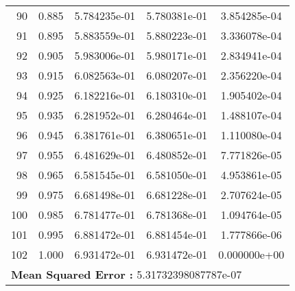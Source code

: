 \begin{table}[ht]
\begin{tabular}{rcccc}
    90 &  0.885 &    5.784235e-01 &    5.780381e-01  &     3.854285e-04\\ 
    91 &  0.895 &    5.883559e-01 &    5.880223e-01  &     3.336078e-04\\ 
    92 &  0.905 &    5.983006e-01 &    5.980171e-01  &     2.834941e-04\\ 
    93 &  0.915 &    6.082563e-01 &    6.080207e-01  &     2.356220e-04\\ 
    94 &  0.925 &    6.182216e-01 &    6.180310e-01  &     1.905402e-04\\ 
    95 &  0.935 &    6.281952e-01 &    6.280464e-01  &     1.488107e-04\\ 
    96 &  0.945 &    6.381761e-01 &    6.380651e-01  &     1.110080e-04\\ 
    97 &  0.955 &    6.481629e-01 &    6.480852e-01  &     7.771826e-05\\ 
    98 &  0.965 &    6.581545e-01 &    6.581050e-01  &     4.953861e-05\\ 
    99 &  0.975 &    6.681498e-01 &    6.681228e-01  &     2.707624e-05\\ 
    100 &  0.985 &    6.781477e-01 &    6.781368e-01  &     1.094764e-05\\ 
    101 &  0.995 &    6.881472e-01 &    6.881454e-01  &     1.777866e-06\\ 
    102 &  1.000 &    6.931472e-01 &    6.931472e-01  &     0.000000e+00\\ 
    \hline
     \multicolumn{5}{l}{\textbf{Mean Squared Error :} 5.31732398087787e-07}\\ 
  \end{tabular}
  \label{lbl:tabloExmp3_test}
\end{table}
